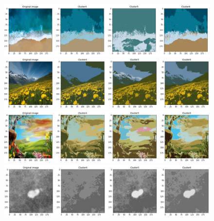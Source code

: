 \documentclass{article}
\begin{document}
\begin{figure}[h!]
\centerline{\includegraphics[scale=0.45]{images/segmented_k_means8.png}}
\centerline{\includegraphics[scale=0.45]{images/segmented_k_means6.png}}
\centerline{\includegraphics[scale=0.45]{images/segmented_k_means7.png}}
\centerline{\includegraphics[scale=0.45]{images/segmented_k_means0.png}}
\end{figure}

\newpage
\end{document}
